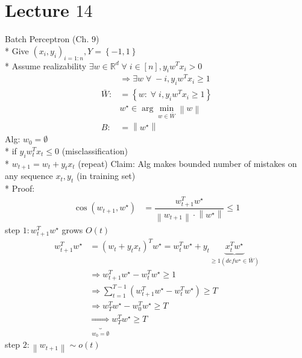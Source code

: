 \documentclass{article}
\begin{document}
\section{Lecture $14$} 
Batch Perceptron (Ch. $9$)
\\* Give $\left(x_{i}, y_{i}\right)_{i = 1:n}, Y  = \left\{-1, 1\right\}$
\\* Assume realizability $\exists w \in \mathbb{R}^{d} \;\forall\; i \in \left[n\right], y_{i} w^{T} x_{i} > 0$
\begin{align*}
&\Rightarrow  \exists w \;\forall\; -i, y_{i} w^{T} x_{i} \geq  1
\\ \bar{W} :&= \left\{w: \;\forall\; i, y_{i} w^{T} x_{i} \geq  1\right\}
\\ &w^\star  \in \arg\displaystyle\min_{w \in \bar{W}} \left\|w\right\|
\\ B  :&= \left\|w^\star \right\|
\end{align*}
Alg: $w_{0} = \emptyset$
\\* if $y_{i} w_{t}^{T} x_{t} \leq  0$ (misclassification)
\\* $w_{t+1} = w_{t} + y_{t} x_{t}$ (repeat)
\newline \newline
Claim: Alg makes bounded number of mistakes on any sequence $x_{t}, y_{t}$ (in training set)
\\* Proof:
\begin{align*}
\cos\left(w_{t+1}, w^\star \right) &= \dfrac{w_{t+1}^{T} w^\star }{\left\|w_{t+1}\right\| \cdot  \left\|w^\star \right\|} \leq  1
\end{align*}
step $1: w_{t+1}^{T} w^\star $ grows $O\left(t\right) $
\begin{align*}
w_{t+1}^{T} w^\star  &= \left(w_{t} + y_{t} x_{t}\right)^{T} w^\star  = w_{t}^{T} w^\star  + y_{t} \underbrace{x_{t}^{T} w^\star }_{\geq  1 \left(def  w^\star  \in \bar{W}\right)}
\\ &\Rightarrow  w_{t+1}^{T} w^\star  - w_{t}^{T} w^\star  \geq  1
\\ &\Rightarrow  \displaystyle\sum_{t=1}^{T-1} \left(w_{t+1}^{T} w^\star  - w_{t}^{T} w^\star \right) \geq  T 
\\ &\Rightarrow  w_{T}^{T} w^\star  - w_{0}^{T} w^\star  \geq  T 
\\ &\underbrace{\Rightarrow }_{w_{0} = \emptyset} w_{T}^{T} w^\star  \geq  T 
\end{align*}
step $2: \left\|w_{t+1}\right\| \sim  o\left(t\right) $
\end{document}
